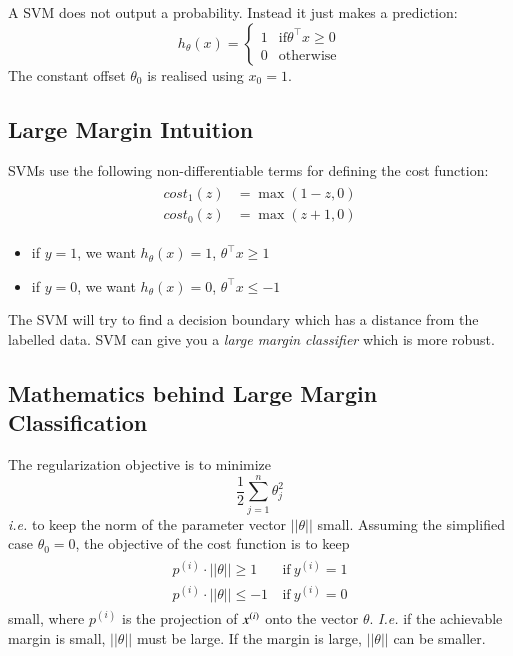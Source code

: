 \documentclass[a4paper,twoside,10pt]{article}
\begin{document}
A \ac{SVM} does not output a probability. Instead it just makes a prediction:
\begin{equation*}
  h_\theta(x)=\left\{\begin{array}{rl}1&\mathrm{if }\theta^\top x\ge 0\\0&\mathrm{otherwise}\end{array}\right.
\end{equation*}
The constant offset $\theta_0$ is realised using $x_0=1$.

\subsection{Large Margin Intuition}
\acp{SVM} use the following non-differentiable terms for defining the cost function:
\begin{align*}
  \begin{split}
    cost_1(z)&=\operatorname{max}(1-z,0)\\
    cost_0(z)&=\operatorname{max}(z+1,0)
  \end{split}
\end{align*}
\begin{itemize}
  \item if $y=1$, we want $h_\theta(x)=1$, $\theta^\top x\ge 1$
  \item if $y=0$, we want $h_\theta(x)=0$, $\theta^\top x\le -1$
\end{itemize}
The \ac{SVM} will try to find a decision boundary which has a distance from the labelled data.
\ac{SVM} can give you a \emph{large margin classifier} which is more robust.

\subsection{Mathematics behind Large Margin Classification}
The regularization objective is to minimize
\begin{equation*}
  \frac{1}{2}\sum_{j=1}^n\theta_j^2
\end{equation*}
\emph{i.e.} to keep the norm of the parameter vector $||\theta||$ small.
Assuming the simplified case $\theta_0=0$, the objective of the cost function is to keep
\begin{align*}
  \begin{split}
    p^{(i)}\cdot||\theta||\ge 1&\mathrm{\ if\ }y^{(i)}=1\\
    p^{(i)}\cdot||\theta||\le -1&\mathrm{\ if\ }y^{(i)}=0
  \end{split}
\end{align*}
small, where $p^{(i)}$ is the projection of $x^{(i)}$ onto the vector $\theta$.
\emph{I.e.} if the achievable margin is small, $||\theta||$ must be large.
If the margin is large, $||\theta||$ can be smaller.
\end{document}
